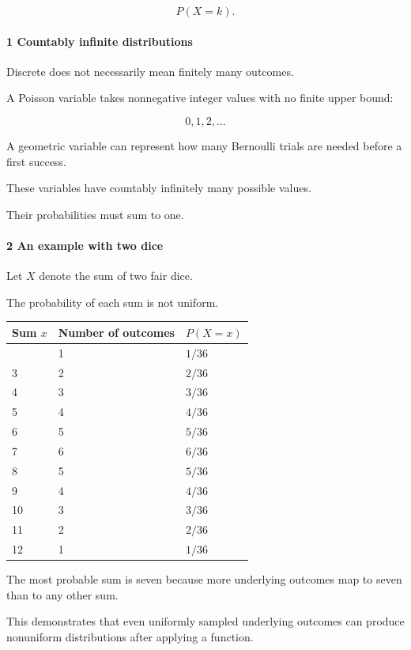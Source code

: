 \[
 P(X=k).
\]

\paragraph{1 Countably infinite distributions}\label{countably-infinite-distributions}

Discrete does not necessarily mean finitely many outcomes.

A Poisson variable takes nonnegative integer values with no finite upper bound:

\[
 0,1,2,\ldots
\]

A geometric variable can represent how many Bernoulli trials are needed before a first success.

These variables have countably infinitely many possible values.

Their probabilities must sum to one.

\paragraph{2 An example with two dice}\label{an-example-with-two-dice}

Let \(X\) denote the sum of two fair dice.

The probability of each sum is not uniform.

{\def\LTcaptype{none} %
\begin{longtable}[]{@{}lll@{}}
\toprule\noalign{}
Sum \(x\) & Number of outcomes & \(P(X=x)\) \\
\midrule\noalign{}
\endhead
\bottomrule\noalign{}
\endlastfoot
2 & 1 & \(1/36\) \\
3 & 2 & \(2/36\) \\
4 & 3 & \(3/36\) \\
5 & 4 & \(4/36\) \\
6 & 5 & \(5/36\) \\
7 & 6 & \(6/36\) \\
8 & 5 & \(5/36\) \\
9 & 4 & \(4/36\) \\
10 & 3 & \(3/36\) \\
11 & 2 & \(2/36\) \\
12 & 1 & \(1/36\) \\
\end{longtable}
}

The most probable sum is seven because more underlying outcomes map to seven than to any other sum.

This demonstrates that even uniformly sampled underlying outcomes can produce nonuniform distributions after applying a function.

